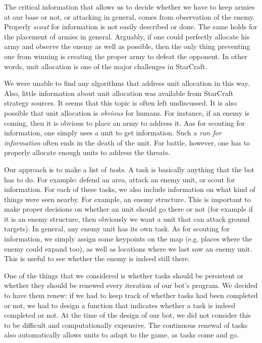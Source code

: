 The critical information that allows us to decide whether we have to keep armies at our base or not, or attacking in general, comes from observation of the enemy. Properly \emph{scout} for information is not easily described or done. The same holds for the placement of armies in general. Arguably, if one could perfectly allocate his army and observe the enemy as well as possible, then the only thing preventing one from winning is creating the proper army to defeat the opponent. In other words, unit allocation is one of the major challenges in StarCraft.

We were unable to find any algorithms that address unit allocation in this way. Also, little information about unit allocation was available from StarCraft strategy sources. It seems that this topic is often left undiscussed. It is also possible that unit allocation is \emph{obvious} for humans. For instance, if an enemy is coming, then it is obvious to place an army to address it. Aas for scouting for information, one simply uses a unit to get information. Such a \emph{run for information} often ends in the death of the unit. For battle, however, one has to properly allocate enough units to address the threats.

Our approach is to make a list of \emph{tasks}. A task is basically anything that the bot has to do. For example: defend an area, attack an enemy unit, or scout for information. For each of these tasks, we also include information on what kind of things were seen nearby. For example, an enemy structure. This is important to make proper decisions on whether an unit should go there or not (for example if it is an enemy structure, then obviously we want a unit that can attack ground targets). In general, any enemy unit has its own task. As for scouting for information, we simply assign some keypoints on the map (e.g. places where the enemy could expand too), as well as locations where we last saw an enemy unit. This is useful to see whether the enemy is indeed still there.

One of the things that we considered is whether tasks should be persistent or whether they should be renewed every iteration of our bot's program. We decided to have them renew: if we had to keep track of whether tasks had been completed or not, we had to design a function that indicates whether a task is indeed completed or not. At the time of the design of our bot, we did not consider this to be difficult and computationally expensive. The continuous renewal of tasks also automatically allows units to adapt to the game, as tasks come and go.


